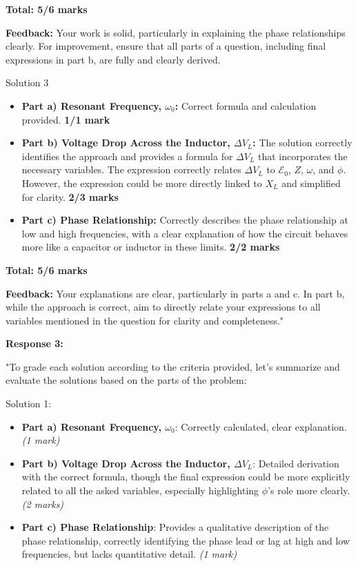 \documentclass[a4paper,11pt]{article}
\begin{document}
\textbf{Total: 5/6 marks}

\textbf{Feedback:} Your work is solid, particularly in explaining the phase relationships clearly. For improvement, ensure that all parts of a question, including final expressions in part b, are fully and clearly derived.

Solution 3

\begin{itemize}
    \item \textbf{Part a) Resonant Frequency, \( \omega_{0} \):} Correct formula and calculation provided. \textbf{1/1 mark}
    \item \textbf{Part b) Voltage Drop Across the Inductor, \( \Delta V_{L} \):} The solution correctly identifies the approach and provides a formula for \( \Delta V_{L} \) that incorporates the necessary variables. The expression correctly relates \( \Delta V_{L} \) to \( \mathcal{E}_{0} \), \(Z\), \( \omega \), and \( \phi \). However, the expression could be more directly linked to \(X_{L}\) and simplified for clarity. \textbf{2/3 marks}
    \item \textbf{Part c) Phase Relationship:} Correctly describes the phase relationship at low and high frequencies, with a clear explanation of how the circuit behaves more like a capacitor or inductor in these limits. \textbf{2/2 marks}
\end{itemize}

\textbf{Total: 5/6 marks}

\textbf{Feedback:} Your explanations are clear, particularly in parts a and c. In part b, while the approach is correct, aim to directly relate your expressions to all variables mentioned in the question for clarity and completeness."

\textbf{Response 3:}

"To grade each solution according to the criteria provided, let's summarize and evaluate the solutions based on the parts of the problem:

Solution 1:

\begin{itemize}
    \item \textbf{Part a) Resonant Frequency, \( \omega_{0} \)}: Correctly calculated, clear explanation. \textit{(1 mark)}
    \item \textbf{Part b) Voltage Drop Across the Inductor, \( \Delta V_{L} \)}: Detailed derivation with the correct formula, though the final expression could be more explicitly related to all the asked variables, especially highlighting \( \phi \)'s role more clearly. \textit{(2 marks)}
    \item \textbf{Part c) Phase Relationship}: Provides a qualitative description of the phase relationship, correctly identifying the phase lead or lag at high and low frequencies, but lacks quantitative detail. \textit{(1 mark)}
\end{itemize}
\end{document}

